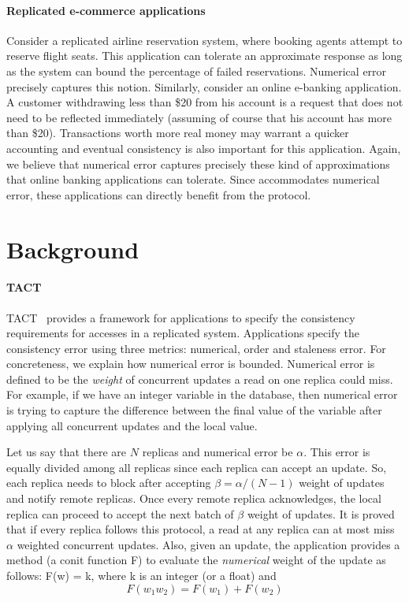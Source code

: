\documentclass[twocolumn,10pt]{article}
\begin{document}
\paragraph{Replicated e-commerce applications} Consider
a replicated airline reservation system, where booking agents attempt to reserve flight seats. 
This application can tolerate an approximate response
as long as the system can bound the percentage of failed reservations. Numerical error precisely
captures this notion. Similarly, consider an online e-banking application. 
A customer
withdrawing less than \$20 from his account is a request that does not need to be reflected
immediately (assuming of course that his account has more than \$20). Transactions worth
more real money may warrant a quicker accounting and eventual consistency is also
important for this application.
Again, we believe that numerical error captures precisely these kind of approximations that online
banking applications can tolerate. Since \Sys accommodates
numerical error, these applications can directly benefit from the \Sys protocol.


\section{Background}
\label{sec:Background}

\paragraph{TACT} TACT~\cite{Yu2002} provides a framework for applications to specify
the consistency requirements for accesses in a replicated system.
Applications specify the consistency
error using three metrics: numerical, order and staleness error.
For concreteness, we explain how numerical error is bounded.
Numerical error is defined to be the \textit{weight} of concurrent updates
a read on one replica could miss. For example, if we have an integer variable
in the database, then numerical error is trying to capture the difference between
the final value of the variable after applying all concurrent updates and the
local value.

Let us say that there are $N$ replicas and numerical error be $\alpha$.
This error is equally divided among all replicas since each replica
can accept an update. 
So, each replica needs to block after
accepting $\beta=\alpha/(N-1)$ weight of updates and notify remote replicas. 
Once every remote replica acknowledges, the local replica can
proceed to accept the next batch of $\beta$ weight of updates. It is proved
that if every replica follows this protocol, a read at any replica can at
most miss $\alpha$ weighted concurrent updates. Also, given an update, 
the application provides a method (a conit function F) to evaluate the \textit{numerical}
weight of the update as follows: 
F(w) = k, where k is an integer (or a float) and\\
\begin{equation}
F(w_1 w_2)=F(w_1)+F(w_2)\label{eqn:conits}
\end{equation}
\end{document}
